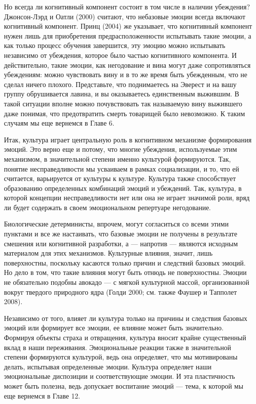 \documentclass[11pt]{book}
\begin{document}
Но всегда ли когнитивный компонент состоит в том числе в наличии убеждения? Джонсон-Лэрд и Оатли (2000) считают, что небазовые эмоции всегда включают когнитивный компонент. Принц (2004) же указывает, что когнитивный компонент нужен лишь для приобретения предрасположенности испытывать такие эмоции, а как только процесс обучения завершится, эту эмоцию можно испытывать независимо от убеждения, которое было частью когнитивного компонента. И действительно, такие эмоции, как негодование и вина могут даже сопротивляться убеждениям: можно чувствовать вину и в то же время быть убежденным, что не сделал ничего плохого. Представьте, что поднимаетесь на Эверест и на вашу группу обрушивается лавина, и вы оказываетесь единственным выжившим. В такой ситуации вполне можно почувствовать так называемую вину выжившего даже понимая, что предотвратить смерть товарищей было невозможно. К таким случаям мы еще вернемся в Главе 6.

Итак, культура играет центральную роль в когнитивном механизме формирования эмоций. Это верно еще и потому, что многие убеждения, используемые этим механизмом, в значительной степени именно культурой формируются. Так, понятие несправедливости мы усваиваем в рамках социализации, и то, что ей считается, варьируется от культуры к культуре. Культура также способствует образованию определенных комбинаций эмоций и убеждений. Так, культура, в которой концепции несправедливости нет или она не играет значимой роли, вряд ли будет содержать в своем эмоциональном репертуаре негодование.

Биологические детерминисты, впрочем, могут согласиться со всеми этими пунктами и все же настаивать, что базовые эмоции не получены в результате смешения или когнитивной разработки, а --- напротив --- являются исходным материалом для этих механизмов. Культурные влияния, значит, лишь поверхностны, поскольку касаются только причин и следствий базовых эмоций. Но дело в том, что такие влияния могут быть отнюдь не поверхностны. Эмоции не обязательно подобны авокадо --- с мягкой культурной массой, организованной вокруг твердого природного ядра (Голди 2000; см. также Фаушер и Тапполет 2008).

Независимо от того, влияет ли культура только на причины и следствия базовых эмоций или формирует все эмоции, ее влияние может быть значительно. Формируя объекты страха и отвращения, культура вносит крайне существенный вклад в наши переживания. Эмоциональные реакции также в значительной степени формируются культурой, ведь она определяет, что мы мотивированы делать, испытывая определенные эмоции. Культура определяет наши эмоциональные диспозиции и соответствующие эмоции. И эта пластичность может быть полезна, ведь допускает воспитание эмоций --- тема, к которой мы еще вернемся в Главе 12.
\end{document}
